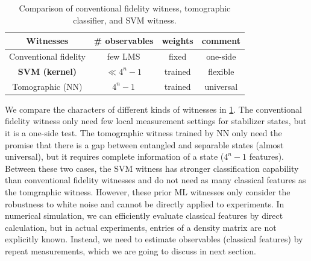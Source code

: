 \documentclass[
aps,
pra,
twocolumn,
floatfix,
]{revtex4-2}
\theoremstyle{plain}
\theoremstyle{definition}
\begin{document}
\begin{table}[!ht]
	\centering
	\begin{tabular}{c|c|c|c}
		Witnesses & \# observables & weights & comment \\
		\hline
		Conventional fidelity   & few LMS & fixed & one-side  \\  
		\textbf{SVM (kernel) } &  $\ll 4^n-1$ & trained & flexible \\  
		Tomographic (NN)  & $4^n-1$ & trained & universal \\  
		\hline
	\end{tabular}
	\caption{Comparison of conventional fidelity witness, tomographic classifier, and SVM witness.}
	\label{tab:comparison}
\end{table}
We compare the characters of different kinds of witnesses in \cref{tab:comparison}. 
The conventional fidelity witness only need few local measurement settings for stabilizer states, but it is a one-side test. 
The tomographic witness trained by NN only need the promise that there is a gap between entangled and separable states (almost universal), but it requires complete information of a state ($4^n-1$ features).
Between these two cases, the SVM witness has stronger classification capability than conventional fidelity witnesses and do not need as many classical features as the tomgraphic witness.
However, these prior ML witnesses only consider the robustness to white noise and cannot be directly applied to experiments.
In numerical simulation, we can efficiently evaluate classical features by direct calculation, 
but in actual experiments, entries of a density matrix are not explicitly known.
Instead, we need to estimate observables (classical features) by repeat measurements, which we are going to discuss in next section.


\end{document}
